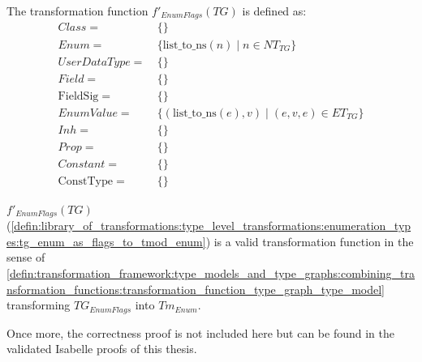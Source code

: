 \begin{defin}
\label{defin:library_of_transformations:type_level_transformations:enumeration_types:tg_enum_as_flags_to_tmod_enum}
The transformation function $f'_{EnumFlags}(TG)$ is defined as:
\begin{align*}
Class =\ &\{\} \\
Enum =\ &\{\mathrm{list\_\!to\_\!ns}(n) \mid n \in NT_{TG}\} \\
UserDataType =\ &\{\} \\
Field =\ &\{\} \\
\mathrm{FieldSig} =\ &\{\} \\
EnumValue =\ &\{(\mathrm{list\_\!to\_\!ns}(e), v) \mid (e, v, e) \in ET_{TG} \} \\
Inh =\ &\{\} \\
Prop =\ &\{\} \\
Constant =\ &\{\} \\
\mathrm{ConstType} =\ &\{\}
\end{align*}
\end{defin}

\begin{thm}
\label{defin:library_of_transformations:type_level_transformations:enumeration_types:tg_enum_as_flags_to_tmod_enum_func}
$f'_{EnumFlags}(TG)$ (\cref{defin:library_of_transformations:type_level_transformations:enumeration_types:tg_enum_as_flags_to_tmod_enum}) is a valid transformation function in the sense of \cref{defin:transformation_framework:type_models_and_type_graphs:combining_transformation_functions:transformation_function_type_graph_type_model} transforming $TG_{EnumFlags}$ into $Tm_{Enum}$.
\end{thm}

Once more, the correctness proof is not included here but can be found in the validated Isabelle proofs of this thesis.